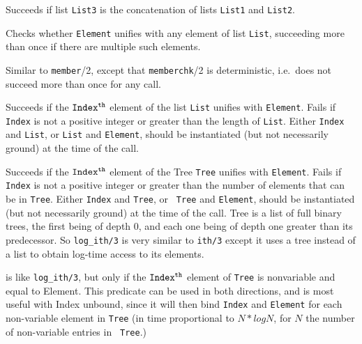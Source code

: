 \begin{description}
    Succeeds if list {\tt List3} is the concatenation of lists 
    {\tt List1} and {\tt List2}.

    Checks whether {\tt Element} unifies with any element of list 
    {\tt List}, succeeding more than once if there are multiple 
    such elements.

    Similar to {\tt member}/2, except that {\tt memberchk}/2 is
    deterministic, i.e.\ does not succeed more than once for any call.

    Succeeds if the ${\tt Index^{th}}$ element of the list {\tt List} 
    unifies with {\tt Element}.  Fails if {\tt Index} is not a positive
    integer or greater than the length of {\tt List}.
    Either {\tt Index} and {\tt List}, or {\tt List} and {\tt Element}, 
    should be instantiated (but not necessarily ground) at the time of 
    the call.

    Succeeds if the ${\tt Index^{th}}$ element of the Tree {\tt Tree}
    unifies with {\tt Element}.  Fails if {\tt Index} is not a
    positive integer or greater than the number of elements that can
    be in {\tt Tree}.  Either {\tt Index} and {\tt Tree}, or {\tt
    Tree} and {\tt Element}, should be instantiated (but not
    necessarily ground) at the time of the call.  Tree is a list of
    full binary trees, the first being of depth 0, and each one being
    of depth one greater than its predecessor.  So {\tt log\_ith/3} is
    very similar to {\tt ith/3} except it uses a tree instead of a
    list to obtain log-time access to its elements.

    is like {\tt log\_ith/3}, but only if the ${\tt Index^{th}}$ element
    of {\tt Tree} is nonvariable and equal to Element.  This predicate
    can be used in both directions, and is most useful with Index
    unbound, since it will then bind {\tt Index} and {\tt Element} for
    each non-variable element in {\tt Tree} (in time proportional to
    $N*logN$, for $N$ the number of non-variable entries in {\tt
    Tree}.)


\end{description}
